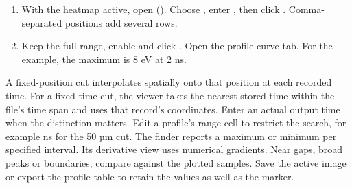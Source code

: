 \begin{enumerate}
\item With the heatmap active, open  (). Choose , enter , then click . Comma-separated positions add several rows.
\item Keep the full range, enable  and click . Open the profile-curve tab. For the example, the maximum is 8 eV at 2 ns.
\end{enumerate}
A fixed-position cut interpolates spatially onto that position at each recorded time. For a fixed-time cut, the viewer takes the nearest stored time within the file's time span and uses that record's coordinates. Enter an actual output time when the distinction matters.
Edit a profile's range cell to restrict the search, for example  ns for the 50 µm cut. The finder reports a maximum or minimum per specified interval. Its derivative view uses numerical gradients. Near gaps, broad peaks or boundaries, compare against the plotted samples. Save the active image or export the profile table to retain the values as well as the marker.

